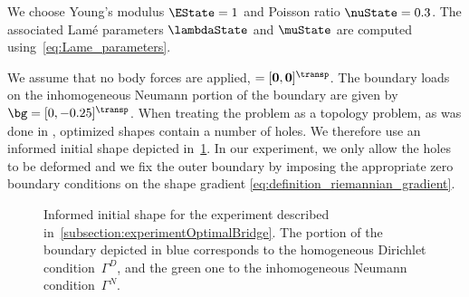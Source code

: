 We choose Young's modulus $\EState = 1$ and Poisson ratio $\nuState = 0.3$.
The associated Lamé parameters $\lambdaState$ and $\muState$ are computed using~\eqref{eq:Lame_parameters}.

We assume that no body forces are applied, \ie $\bf = [0,0]^\transp$.
The boundary loads on the inhomogeneous Neumann portion of the boundary are given by $\bg = [0,-0.25]^\transp$.
When treating the problem as a topology problem, as was done in \cite[Section~6.2.1]{AllaireDapognyFrey:2014:1}, optimized shapes contain a number of holes.
We therefore use an informed initial shape depicted in~\cref{fig:initialOptimalBridge}.
In our experiment, we only allow the holes to be deformed and we fix the outer boundary by imposing the appropriate zero boundary conditions on the shape gradient \eqref{eq:definition_riemannian_gradient}.

\begin{figure}
	\caption{Informed initial shape for the experiment described in~\cref{subsection:experimentOptimalBridge}. The portion of the boundary depicted in blue corresponds to the homogeneous Dirichlet condition~$\Gamma^D$, and the green one to the inhomogeneous Neumann condition~$\Gamma^N$.}
	\label{fig:initialOptimalBridge}
\end{figure}

